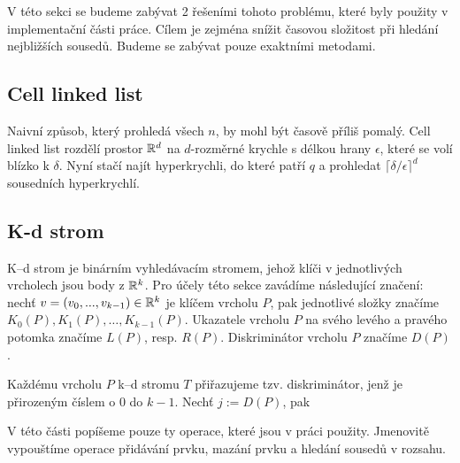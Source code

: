 V této sekci se budeme zabývat 2 řešeními tohoto problému, které byly použity v implementační části práce. Cílem je zejména snížit časovou složitost při hledání nejbližších sousedů. Budeme se zabývat pouze exaktními metodami.

\subsection{Cell linked list}

Naivní způsob, který prohledá všech $n$, by mohl být časově příliš pomalý. Cell linked list rozdělí prostor $\mathbb{R}^d$ na $d$-rozměrné krychle s délkou hrany $\epsilon$, které se volí blízko k $\delta$. Nyní stačí najít hyperkrychli, do které patří $q$ a prohledat $\lceil \delta / \epsilon \rceil^d$ sousedních hyperkrychlí.

\subsection{K-d strom}

K--d strom je binárním vyhledávacím stromem, jehož klíči v jednotlivých vrcholech jsou body z $\mathbb{R}{}^k$. Pro účely této sekce zavádíme následující značení: nechť $v = (v_0, ..., v_{k - 1})  \in \mathbb{R}^k$ je klíčem vrcholu $P$, pak jednotlivé složky značíme $K_0(P), K_1(P), \ldots, K_{k - 1}(P)$. Ukazatele vrcholu $P$ na svého levého a pravého potomka značíme $L(P)$, resp. $R(P)$. Diskriminátor vrcholu $P$ značíme $D(P)$.

Každému vrcholu $P$ k--d stromu $T$ přiřazujeme tzv. diskriminátor, jenž je přirozeným číslem o $0$ do $k - 1$. Nechť $j := D(P)$, pak 

V této části popíšeme pouze ty operace, které jsou v práci použity. Jmenovitě vypouštíme operace přidávání prvku, mazání prvku a hledání sousedů v rozsahu.

